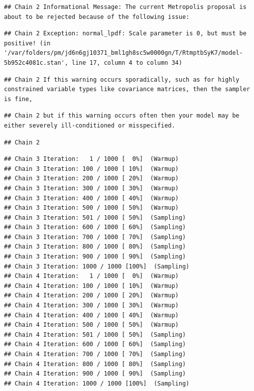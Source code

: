 \documentclass[
]{book}
\begin{document}
\begin{verbatim}
## Chain 2 Informational Message: The current Metropolis proposal is about to be rejected because of the following issue:
\end{verbatim}

\begin{verbatim}
## Chain 2 Exception: normal_lpdf: Scale parameter is 0, but must be positive! (in '/var/folders/pm/jd6n6gj10371_bml1gh8sc5w0000gn/T/RtmptbSyK7/model-5b952c4081c.stan', line 17, column 4 to column 34)
\end{verbatim}

\begin{verbatim}
## Chain 2 If this warning occurs sporadically, such as for highly constrained variable types like covariance matrices, then the sampler is fine,
\end{verbatim}

\begin{verbatim}
## Chain 2 but if this warning occurs often then your model may be either severely ill-conditioned or misspecified.
\end{verbatim}

\begin{verbatim}
## Chain 2
\end{verbatim}

\begin{verbatim}
## Chain 3 Iteration:   1 / 1000 [  0%]  (Warmup) 
## Chain 3 Iteration: 100 / 1000 [ 10%]  (Warmup) 
## Chain 3 Iteration: 200 / 1000 [ 20%]  (Warmup) 
## Chain 3 Iteration: 300 / 1000 [ 30%]  (Warmup) 
## Chain 3 Iteration: 400 / 1000 [ 40%]  (Warmup) 
## Chain 3 Iteration: 500 / 1000 [ 50%]  (Warmup) 
## Chain 3 Iteration: 501 / 1000 [ 50%]  (Sampling) 
## Chain 3 Iteration: 600 / 1000 [ 60%]  (Sampling) 
## Chain 3 Iteration: 700 / 1000 [ 70%]  (Sampling) 
## Chain 3 Iteration: 800 / 1000 [ 80%]  (Sampling) 
## Chain 3 Iteration: 900 / 1000 [ 90%]  (Sampling) 
## Chain 3 Iteration: 1000 / 1000 [100%]  (Sampling) 
## Chain 4 Iteration:   1 / 1000 [  0%]  (Warmup) 
## Chain 4 Iteration: 100 / 1000 [ 10%]  (Warmup) 
## Chain 4 Iteration: 200 / 1000 [ 20%]  (Warmup) 
## Chain 4 Iteration: 300 / 1000 [ 30%]  (Warmup) 
## Chain 4 Iteration: 400 / 1000 [ 40%]  (Warmup) 
## Chain 4 Iteration: 500 / 1000 [ 50%]  (Warmup) 
## Chain 4 Iteration: 501 / 1000 [ 50%]  (Sampling) 
## Chain 4 Iteration: 600 / 1000 [ 60%]  (Sampling) 
## Chain 4 Iteration: 700 / 1000 [ 70%]  (Sampling) 
## Chain 4 Iteration: 800 / 1000 [ 80%]  (Sampling) 
## Chain 4 Iteration: 900 / 1000 [ 90%]  (Sampling) 
## Chain 4 Iteration: 1000 / 1000 [100%]  (Sampling)
\end{verbatim}
\end{document}
